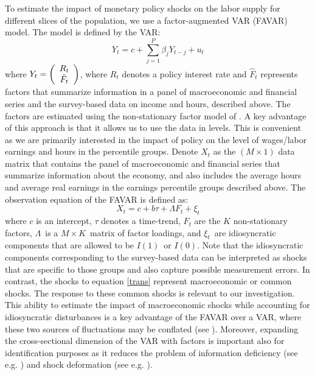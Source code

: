\documentclass[a4paper,12pt]{article}%
\begin{document}
 To estimate the impact of monetary policy shocks on the labor supply for different slices of the population, we use a factor-augmented VAR (FAVAR) model. The model is defined by the VAR:
\begin{equation}
Y_{t}=c+{\displaystyle\sum\limits_{j=1}^{P}} \beta_{j}Y_{t-j}+u_{t}\label{trans}%
\end{equation}
where $Y_{t}=\left(
\begin{array}
[c]{c}%
R_{t}\\
\hat{F}_{t}%
\end{array}
\right)  $, where $R_{t}$ denotes a policy interest rate and $\hat{F}_{t}$ represents factors that summarize information in a panel of macroeconomic and financial series and the survey-based data on income and hours, described above. The factors are estimated using the non-stationary factor model of \citet{BLL:2020}. A key advantage of this approach is that it allows us to use the data in levels. This is convenient as we are primarily interested in the impact of policy on the level of wages/labor earnings and hours in the
percentile groups. Denote %
$X_{t}$ as the $(M\times1)$ data matrix that contains the panel of macroeconomic and financial series that summarize information about the economy, and also includes the average hours and average real earnings in the earnings percentile groups described above. The observation equation of the FAVAR is defined as:
\begin{equation}
X_{t}=c+b\tau+\Lambda F_{t}+\xi_{t}\label{obs}%
\end{equation}
where $c$ is an intercept, $\tau$ denotes a time-trend, $F_{t}$ are the $K$ non-stationary factors, $\Lambda$\ is a $M\times K$\ matrix of factor loadings, and $\xi_{t}$\ are idiosyncratic components that are allowed to be $I(1)$\ or $I(0)$. Note that the idiosyncratic components corresponding to the survey-based data can be interpreted as shocks that are specific to those groups and also capture possible measurement errors. In contrast, the shocks to equation \eqref{trans} represent macroeconomic or common shocks. The response to these common shocks is relevant to our investigation. This ability to estimate the impact of macroeconomic shocks while accounting for idiosyncratic disturbances is a key advantage of the FAVAR over a VAR, where these two sources of fluctuations may be conflated (see \cite{DGG:2017}). Moreover, expanding the cross-sectional dimension of the VAR with factors is important also for identification purposes as it reduces the problem of information deficiency (see e.g. \citet{FG:2014}) and shock deformation (see e.g. \citet{CF:2019}).
\end{document}
